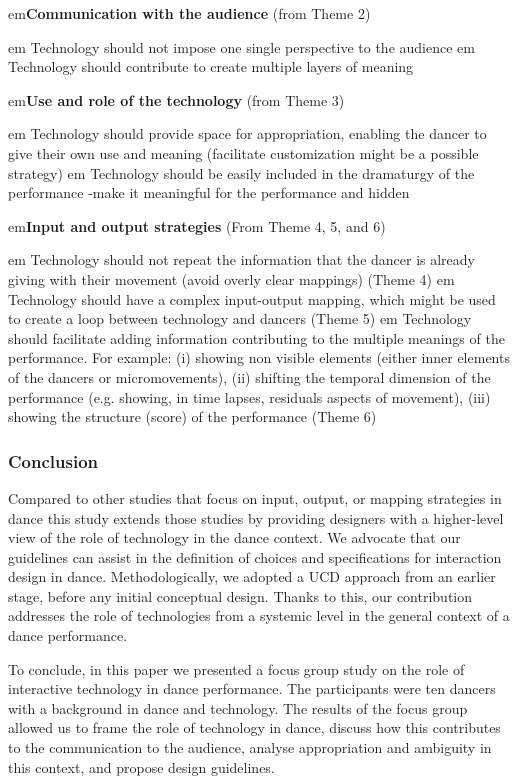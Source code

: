  \renewcommand{\labelitemi}{$\alph$}
 \renewcommand{\labelitemii}{$\alph$}
\begin{enumerate}
em{\bf Communication with the audience}  (from Theme 2)
\begin{enumerate}
em Technology should not impose one single perspective to the audience
em Technology should contribute to create multiple layers of meaning
\end{enumerate}

em{\textbf{Use and role of the technology}} 
(from Theme 3)
\begin{enumerate}
em Technology should provide space for appropriation, enabling the dancer to give their own use and meaning (facilitate customization might be a possible strategy)
em Technology should be easily included in the dramaturgy of the performance -make it meaningful for the performance and hidden
\end{enumerate}


em{\textbf{Input and output strategies}} 
(From Theme 4, 5, and 6) 
\begin{enumerate}
em Technology should not repeat the information that the dancer is already giving with their movement (avoid overly clear mappings) (Theme 4)
em Technology should have a complex input-output mapping, which might be used to create a loop between technology and dancers (Theme 5)
em Technology should facilitate adding information contributing to the multiple meanings of the performance. For example: (i) showing non visible elements (either inner elements of the dancers or micromovements), (ii) shifting the temporal dimension of the performance (e.g. showing, in time lapses, residuals aspects of movement), (iii) showing the structure (score) of the performance (Theme 6)
\end{enumerate}
\end{enumerate}


\subsubsection{Conclusion} 
Compared to other studies that focus on input, output, or mapping strategies in dance this study extends those studies by providing designers with a higher-level view of the role of technology in the dance context. We advocate that our guidelines can assist in the definition of choices and specifications for interaction design in dance. Methodologically, we adopted a UCD approach from an earlier stage, before any initial conceptual design. Thanks to this, our contribution addresses the role of technologies from a systemic level in the general context of a dance performance. 

To conclude, in this paper we presented a focus group study on the role of interactive technology in dance performance. The participants were ten dancers with a background in dance and technology. The results of the focus group allowed us to frame the role of technology in dance, discuss how this contributes to the communication to the audience, analyse appropriation and ambiguity in this context, and propose design guidelines.
